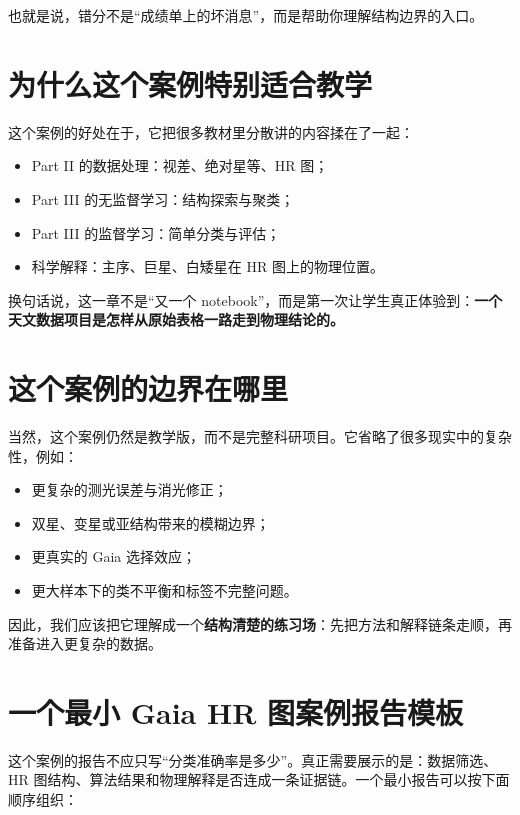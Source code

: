 也就是说，错分不是“成绩单上的坏消息”，而是帮助你理解结构边界的入口。

\section{为什么这个案例特别适合教学}

这个案例的好处在于，它把很多教材里分散讲的内容揉在了一起：

\begin{itemize}
    \item Part II 的数据处理：视差、绝对星等、HR 图；
    \item Part III 的无监督学习：结构探索与聚类；
    \item Part III 的监督学习：简单分类与评估；
    \item 科学解释：主序、巨星、白矮星在 HR 图上的物理位置。
\end{itemize}

换句话说，这一章不是“又一个 notebook”，而是第一次让学生真正体验到：\textbf{一个天文数据项目是怎样从原始表格一路走到物理结论的。}

\section{这个案例的边界在哪里}

当然，这个案例仍然是教学版，而不是完整科研项目。它省略了很多现实中的复杂性，例如：

\begin{itemize}
    \item 更复杂的测光误差与消光修正；
    \item 双星、变星或亚结构带来的模糊边界；
    \item 更真实的 Gaia 选择效应；
    \item 更大样本下的类不平衡和标签不完整问题。
\end{itemize}

因此，我们应该把它理解成一个\textbf{结构清楚的练习场}：先把方法和解释链条走顺，再准备进入更复杂的数据。

\section{一个最小 Gaia HR 图案例报告模板}

这个案例的报告不应只写“分类准确率是多少”。真正需要展示的是：数据筛选、HR 图结构、算法结果和物理解释是否连成一条证据链。一个最小报告可以按下面顺序组织：

